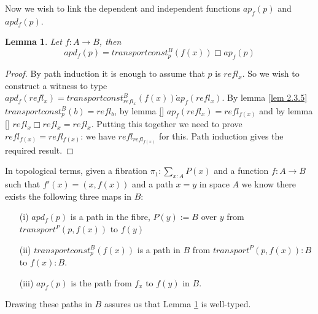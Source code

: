\documentclass[12pt]{article} %
\newtheorem{lem}[thm]{Lemma}
\theoremstyle{definition}
\begin{document}
Now we wish to link the dependent and independent functions $ap_{f}(p)$ and $apd_{f}(p)$.

\begin{lem}\label{lem:2.3.6}
Let $f:A \rightarrow B$, then
\[apd_{f}(p) = transportconst_{p}^{B}(f(x)) \Box ap_{f}(p)\]
\end{lem}
 \begin{proof}
By path induction it is enough to assume that $p$ is $refl_{x}$.  So we wish to construct a witness to type $apd_{f}(refl_{x}) = transportconst_{refl_{x}}^{B}(f(x)) \dot ap_{f}(refl_{x})$.  By lemma \ref{lem 2.3.5} $transportconst^{B}_{p}(b) = refl_{b}$, by lemma \ref{} $ap_{f}(refl_{x}) = refl_{f(x)}$  and by lemma \ref{} $refl_{x} \Box refl_{x} = refl_{x}$.   Putting this together we need to prove  $refl_{f(x)} = refl_{f(x)}$: we have $refl_{refl_{f(x)}}$ for this.  Path induction gives the required result.  
\end{proof}

In topological terms, given a fibration $\pi_{1}:\sum_{x:A}P(x)$ and a function $f:A \rightarrow B$ such that $f'(x) = (x,f(x))$ and a path $x = y$ in space $A$ we know there exists the following three maps in $B$:
\begin{itemize}
\item[(i)] $apd_{f}(p)$ is a path in the fibre, $P(y) := B$ over $y$ from $transport^{P}(p,f(x))$ to $f(y)$
\item[(ii)]$transportconst_{p}^{B}(f(x))$ is a path in $B$ from $transport^{P}(p,f(x)) :B$ to $f(x): B$.   
\item[(iii)]$ap_{f}(p)$ is the path from $f_{x}$ to $f(y)$ in $B$.  
\end{itemize}

Drawing these paths in $B$ assures us that Lemma \ref{lem:2.3.6} is well-typed.  
    
\end{document}

